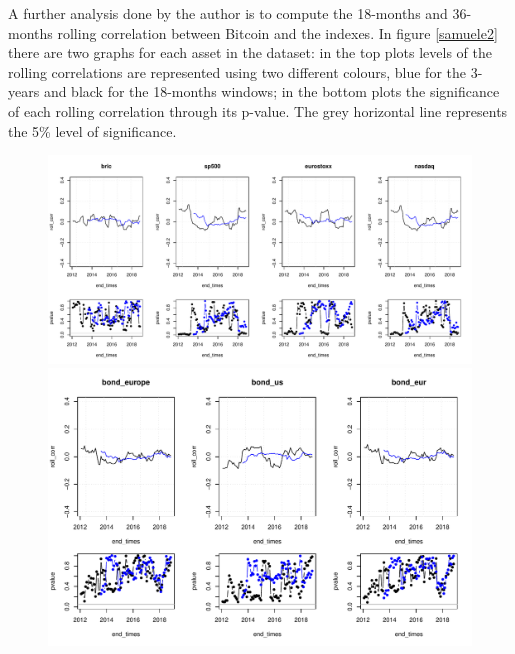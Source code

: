 A further analysis done by the author is to compute the 18-months and 36-months rolling correlation between Bitcoin and the indexes. In figure \ref{samuele2} there are two graphs for each asset in the dataset: in the top plots levels of the rolling correlations are represented using two different colours, blue for the 3-years and black for the 18-months windows; in the bottom plots the significance of each rolling correlation through its p-value. The grey horizontal line represents the 5\% level of significance.
\begin{figure}[htpb]
		\centering
		\includegraphics[width=14.5cm]{Images/images_samuele/rolling_stocks.pdf} %
		\bigskip
		\includegraphics[width=14.5cm]{Images/images_samuele/rolling_bonds.pdf} %
\end{figure}
